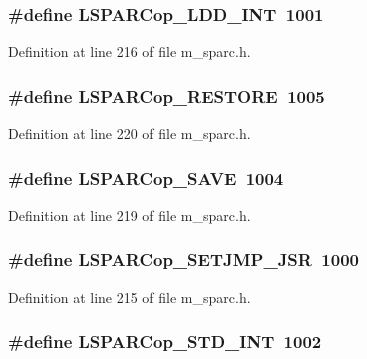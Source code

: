 \subsubsection{\setlength{\rightskip}{0pt plus 5cm}\#define LSPARCop\_\-LDD\_\-INT~1001}\label{m__sparc_8h_f3734915f5be5a29367d5fbae00d19fb}




Definition at line 216 of file m\_\-sparc.h.
\subsubsection{\setlength{\rightskip}{0pt plus 5cm}\#define LSPARCop\_\-RESTORE~1005}\label{m__sparc_8h_06e3c3490a4a96ba3478ef1aacbfbd88}




Definition at line 220 of file m\_\-sparc.h.
\subsubsection{\setlength{\rightskip}{0pt plus 5cm}\#define LSPARCop\_\-SAVE~1004}\label{m__sparc_8h_bf12575008e3a8c2c7b560d7cfab37ea}




Definition at line 219 of file m\_\-sparc.h.
\subsubsection{\setlength{\rightskip}{0pt plus 5cm}\#define LSPARCop\_\-SETJMP\_\-JSR~1000}\label{m__sparc_8h_671c3e872dd810013668151b07f9c889}




Definition at line 215 of file m\_\-sparc.h.
\subsubsection{\setlength{\rightskip}{0pt plus 5cm}\#define LSPARCop\_\-STD\_\-INT~1002}\label{m__sparc_8h_b9b2fb113e50bc1ad7942a7eca579218}





